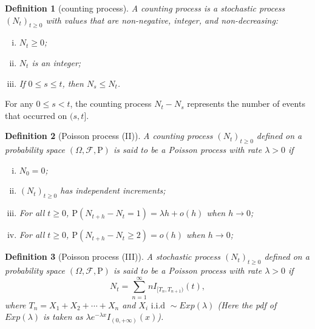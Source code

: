 \documentclass{article}
\newtheorem{definition}{Definition}[section]
\theoremstyle{nonumberplain}
\begin{document}
\begin{definition}[counting process]
	A \emph{counting process} is a stochastic process $(N_t)_{t\ge 0}$ with values that are non-negative, integer, and non-decreasing:
	\begin{enumerate}[(i)]
		\item $N_t\ge0$;
		\item $N_t$ is an integer;
		\item If $0\le s\le t$, then $N_s \le N_t$.
	\end{enumerate}	
		
\end{definition}
For any $0\le s<t$, the counting process $N_t-N_s$ represents the number of events that occurred on $(s,t]$.  


\begin{definition}[Poisson process (II)]
	A counting process $(N_t)_{t\ge0}$ defined on a probability space $(\Omega,\mathcal{F},\mathrm{P})$ is said to be a \emph{Poisson process} with rate $\lambda>0$ if
	\begin{enumerate}[(i)]
		\item $N_0=0$;
		\item $(N_t)_{t\ge0}$ has independent increments;
		\item \hypertarget{Definition 2.3(iii)}{}For all $t\ge0$, $\mathrm{P}(N_{t+h}-N_t=1)=\lambda h+o(h)$ when $h\to0$;
		\item \hypertarget{Definition 2.3(iv)}{}For all $t\ge0$, $\mathrm{P}(N_{t+h}-N_t\ge2)=o(h)$ when $h\to0$;
	\end{enumerate}	
\end{definition}

\begin{definition}[Poisson process (III)]
	A stochastic process $(N_t)_{t\ge0}$ defined on a probability space $(\Omega,\mathcal{F},\mathrm{P})$ is said to be a \emph{Poisson process} with rate $\lambda>0$ if
	\[
	N_t=\sum_{n=1}^{\infty}nI_{[T_n,T_{n+1})}(t),
	\]
	where $T_n=X_1+X_2+\cdots+X_n$ and $X_i\text{ i.i.d }\sim Exp(\lambda)$ (Here the pdf of $Exp(\lambda)$ is taken as $\lambda e^{-\lambda x}I_{(0,+\infty)}(x)$).
\end{definition}
\end{document}
